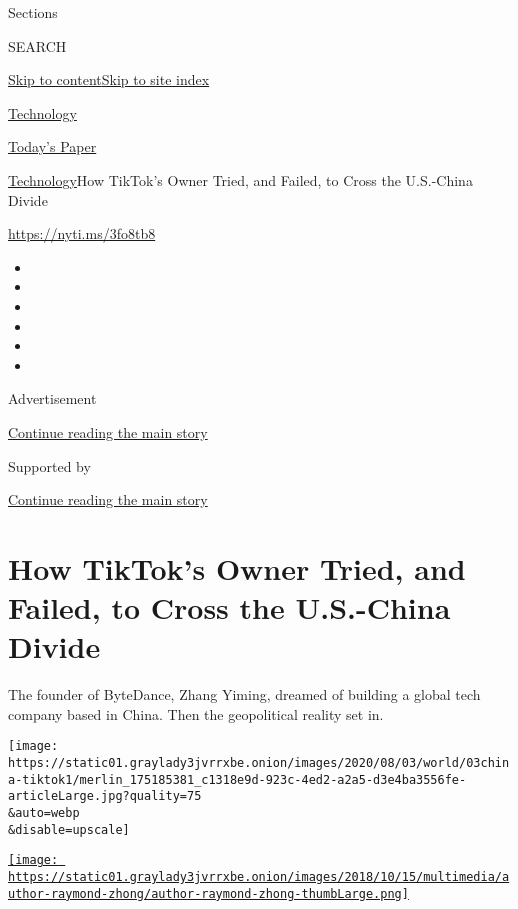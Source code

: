 Sections

SEARCH

\protect\hyperlink{site-content}{Skip to
content}\protect\hyperlink{site-index}{Skip to site index}

\href{https://www.nytimes3xbfgragh.onion/section/technology}{Technology}

\href{https://myaccount.nytimes3xbfgragh.onion/auth/login?response_type=cookie\&client_id=vi}{}

\href{https://www.nytimes3xbfgragh.onion/section/todayspaper}{Today's
Paper}

\href{/section/technology}{Technology}\textbar{}How TikTok's Owner
Tried, and Failed, to Cross the U.S.-China Divide

\href{https://nyti.ms/3fo8tb8}{https://nyti.ms/3fo8tb8}

\begin{itemize}
\item
\item
\item
\item
\item
\item
\end{itemize}

Advertisement

\protect\hyperlink{after-top}{Continue reading the main story}

Supported by

\protect\hyperlink{after-sponsor}{Continue reading the main story}

\hypertarget{how-tiktoks-owner-tried-and-failed-to-cross-the-us-china-divide}{%
\section{How TikTok's Owner Tried, and Failed, to Cross the U.S.-China
Divide}\label{how-tiktoks-owner-tried-and-failed-to-cross-the-us-china-divide}}

The founder of ByteDance, Zhang Yiming, dreamed of building a global
tech company based in China. Then the geopolitical reality set in.

\texttt{[image: https://static01.graylady3jvrrxbe.onion/images/2020/08/03/world/03china-tiktok1/merlin\_175185381\_c1318e9d-923c-4ed2-a2a5-d3e4ba3556fe-articleLarge.jpg?quality=75\\\&auto=webp\\\&disable=upscale]}

\href{https://www.nytimes3xbfgragh.onion/by/raymond-zhong}{\texttt{[image: https://static01.graylady3jvrrxbe.onion/images/2018/10/15/multimedia/author-raymond-zhong/author-raymond-zhong-thumbLarge.png]}}

